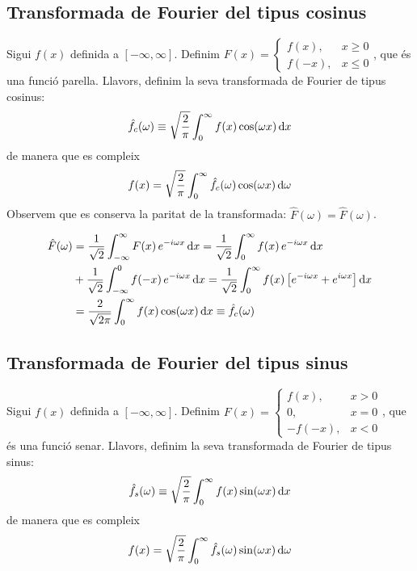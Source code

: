 \subsection{Transformada de Fourier del tipus cosinus}
Sigui $f(x)$ definida a $[-\infty,\infty]$. Definim $F(x) = \begin{cases} f(x), & x \geq 0 \\ f(-x), & x \leq 0 \end{cases}$, que és una funció parella. Llavors, definim la seva transformada de Fourier de tipus cosinus:
\begin{align}
    \hat{f}_{c}(\omega) \equiv \sqrt{\frac{2}{\pi}} \int_{0}^{\infty} f(x) \cos (\omega x) \mathop{}\!\mathrm{d} x
\end{align}
de manera que es compleix
\begin{align}
    f(x) = \sqrt{\frac{2}{\pi}} \int_{0}^{\infty} \hat{f}_{c}(\omega) \cos (\omega x) \mathop{}\!\mathrm{d} \omega
\end{align}
Observem que es conserva la paritat de la transformada: $\hat{F}(\omega) = \hat{F}(\omega)$.
\begin{sproof}
    \begin{align*}
    \begin{aligned}
        \hat{F}(\omega) &= \frac{1}{\sqrt{2}} \int_{-\infty}^{\infty} F(x)\,e^{-i\omega x} \mathop{}\!\mathrm{d} x = \frac{1}{\sqrt{2}} \int_{0}^{\infty} f(x)\,e^{-i\omega x} \mathop{}\!\mathrm{d} x \\ 
        &+ \frac{1}{\sqrt{2}} \int_{-\infty}^{0} f(-x)\,e^{-i\omega x} \mathop{}\!\mathrm{d} x = \frac{1}{\sqrt{2}} \int_{0}^{\infty} f(x) \left[ e^{-i\omega x} + e^{i\omega x} \right] \mathop{}\!\mathrm{d} x \\ 
        &= \frac{2}{\sqrt{2 \pi}} \int_{0}^{\infty} f(x) \cos (\omega x) \mathop{}\!\mathrm{d} x \equiv \hat{f}_{c}(\omega)
    \end{aligned}
    \end{align*}
\end{sproof}

\subsection{Transformada de Fourier del tipus sinus}
Sigui $f(x)$ definida a $[-\infty,\infty]$. Definim $F(x) = \begin{cases} f(x), & x > 0 \\
0, & x = 0 \\ -f(-x), & x < 0 \end{cases}$, que és una funció senar. Llavors, definim la seva transformada de Fourier de tipus sinus:
\begin{align}
    \hat{f}_{s}(\omega) \equiv \sqrt{\frac{2}{\pi}} \int_{0}^{\infty} f(x) \sin (\omega x) \mathop{}\!\mathrm{d} x
\end{align}
de manera que es compleix
\begin{align}
    f(x) = \sqrt{\frac{2}{\pi}} \int_{0}^{\infty} \hat{f}_{s}(\omega) \sin (\omega x) \mathop{}\!\mathrm{d} \omega
\end{align}

